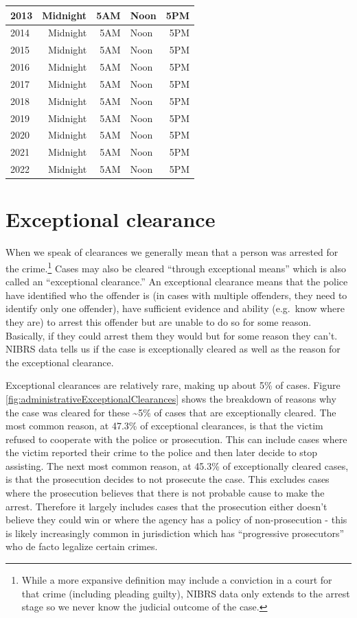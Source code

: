 \documentclass[
]{krantz}
\begin{document}
\begin{longtable}[t]{l|r|r|l|r}
\hline
2013 & Midnight & 5AM & Noon & 5PM\\
\hline
2014 & Midnight & 5AM & Noon & 5PM\\
\hline
2015 & Midnight & 5AM & Noon & 5PM\\
\hline
2016 & Midnight & 5AM & Noon & 5PM\\
\hline
2017 & Midnight & 5AM & Noon & 5PM\\
\hline
2018 & Midnight & 5AM & Noon & 5PM\\
\hline
2019 & Midnight & 5AM & Noon & 5PM\\
\hline
2020 & Midnight & 5AM & Noon & 5PM\\
\hline
2021 & Midnight & 5AM & Noon & 5PM\\
\hline
2022 & Midnight & 5AM & Noon & 5PM\\
\hline
\end{longtable}

\section{Exceptional clearance}\label{exceptional-clearance}

When we speak of clearances we generally mean that a person
was arrested for the crime.\footnote{While a more expansive
  definition may include a conviction in a court for that
  crime (including pleading guilty), NIBRS data only extends
  to the arrest stage so we never know the judicial outcome
  of the case.} Cases may also be cleared ``through
exceptional means'' which is also called an ``exceptional
clearance.'' An exceptional clearance means that the police
have identified who the offender is (in cases with multiple
offenders, they need to identify only one offender), have
sufficient evidence and ability (e.g.~know where they are)
to arrest this offender but are unable to do so for some
reason. Basically, if they could arrest them they would but
for some reason they can't. NIBRS data tells us if the case
is exceptionally cleared as well as the reason for the
exceptional clearance.

Exceptional clearances are relatively rare, making up about
5\% of cases. Figure
\ref{fig:administrativeExceptionalClearances} shows the
breakdown of reasons why the case was cleared for these
\textasciitilde5\% of cases that are exceptionally cleared.
The most common reason, at 47.3\% of exceptional clearances,
is that the victim refused to cooperate with the police or
prosecution. This can include cases where the victim
reported their crime to the police and then later decide to
stop assisting. The next most common reason, at 45.3\% of
exceptionally cleared cases, is that the prosecution decides
to not prosecute the case. This excludes cases where the
prosecution believes that there is not probable cause to
make the arrest. Therefore it largely includes cases that
the prosecution either doesn't believe they could win or
where the agency has a policy of non-prosecution - this is
likely increasingly common in jurisdiction which has
``progressive prosecutors'' who de facto legalize certain
crimes.
\end{document}
